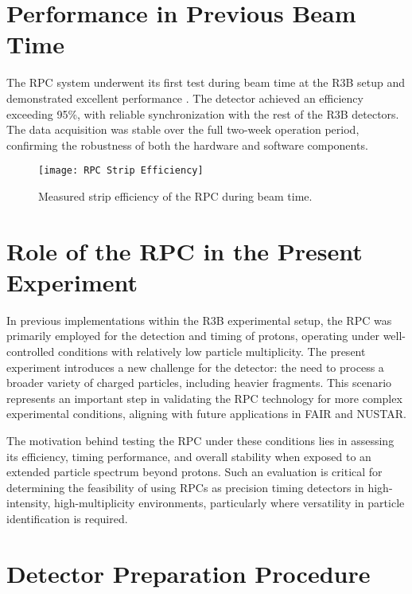 {{{\section{Performance in Previous Beam Time}

The \gls{RPC} system underwent its first test during beam time at the \gls{R3B} setup and demonstrated excellent performance \cite{xarepe_resistive_2023}. The detector achieved an efficiency exceeding 95\%, with reliable synchronization with the rest of the \gls{R3B} detectors. The data acquisition was stable over the full two-week operation period, confirming the robustness of both the hardware and software components.

\begin{figure}[H]
	\centering
	\texttt{[image: RPC Strip Efficiency]}
	\caption{Measured strip efficiency of the RPC during beam time.}
	\label{fig:RPCStripEff}
\end{figure}

\section{Role of the RPC in the Present Experiment}

In previous implementations within the \gls{R3B} experimental setup, the \gls{RPC} was primarily employed for the detection and timing of protons, operating under well-controlled conditions with relatively low particle multiplicity. The present experiment introduces a new challenge for the detector: the need to process a broader variety of charged particles, including heavier fragments. This scenario represents an important step in validating the \gls{RPC} technology for more complex experimental conditions, aligning with future applications in \gls{FAIR} and NUSTAR.

The motivation behind testing the \gls{RPC} under these conditions lies in assessing its efficiency, timing performance, and overall stability when exposed to an extended particle spectrum beyond protons. Such an evaluation is critical for determining the feasibility of using \gls{RPC}s as precision timing detectors in high-intensity, high-multiplicity environments, particularly where versatility in particle identification is required.


\section{Detector Preparation Procedure}

}}}
